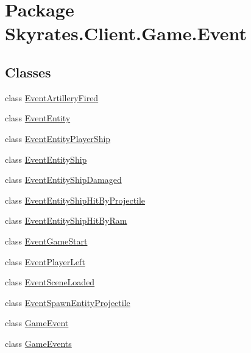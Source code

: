 \hypertarget{namespace_skyrates_1_1_client_1_1_game_1_1_event}{\section{Package Skyrates.\-Client.\-Game.\-Event}
\label{namespace_skyrates_1_1_client_1_1_game_1_1_event}
}
\subsection*{Classes}
\begin{DoxyCompactItemize}
\item 
class \hyperlink{class_skyrates_1_1_client_1_1_game_1_1_event_1_1_event_artillery_fired}{Event\-Artillery\-Fired}
\item 
class \hyperlink{class_skyrates_1_1_client_1_1_game_1_1_event_1_1_event_entity}{Event\-Entity}
\item 
class \hyperlink{class_skyrates_1_1_client_1_1_game_1_1_event_1_1_event_entity_player_ship}{Event\-Entity\-Player\-Ship}
\item 
class \hyperlink{class_skyrates_1_1_client_1_1_game_1_1_event_1_1_event_entity_ship}{Event\-Entity\-Ship}
\item 
class \hyperlink{class_skyrates_1_1_client_1_1_game_1_1_event_1_1_event_entity_ship_damaged}{Event\-Entity\-Ship\-Damaged}
\item 
class \hyperlink{class_skyrates_1_1_client_1_1_game_1_1_event_1_1_event_entity_ship_hit_by_projectile}{Event\-Entity\-Ship\-Hit\-By\-Projectile}
\item 
class \hyperlink{class_skyrates_1_1_client_1_1_game_1_1_event_1_1_event_entity_ship_hit_by_ram}{Event\-Entity\-Ship\-Hit\-By\-Ram}
\item 
class \hyperlink{class_skyrates_1_1_client_1_1_game_1_1_event_1_1_event_game_start}{Event\-Game\-Start}
\item 
class \hyperlink{class_skyrates_1_1_client_1_1_game_1_1_event_1_1_event_player_left}{Event\-Player\-Left}
\item 
class \hyperlink{class_skyrates_1_1_client_1_1_game_1_1_event_1_1_event_scene_loaded}{Event\-Scene\-Loaded}
\item 
class \hyperlink{class_skyrates_1_1_client_1_1_game_1_1_event_1_1_event_spawn_entity_projectile}{Event\-Spawn\-Entity\-Projectile}
\item 
class \hyperlink{class_skyrates_1_1_client_1_1_game_1_1_event_1_1_game_event}{Game\-Event}
\item 
class \hyperlink{class_skyrates_1_1_client_1_1_game_1_1_event_1_1_game_events}{Game\-Events}
\end{DoxyCompactItemize}
